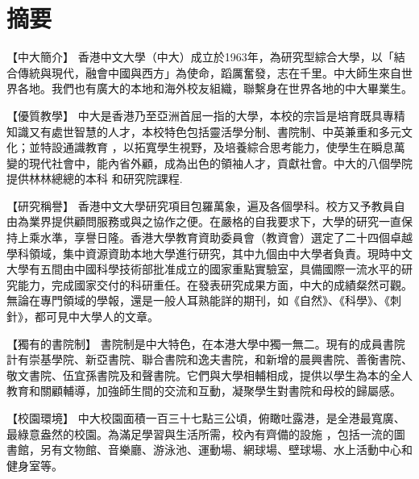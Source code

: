 
\newcommand{\forceindent}{\leavevmode{\parindent=1em\indent}}

\pagestyle{plain}

\chapter*{摘要}
\vspace*{-10mm}

\forceindent
【中大簡介】
香港中文大學（中大）成立於1963年，為研究型綜合大學，以「結合傳統與現代，融會中國與西方」為使命，蹈厲奮發，志在千里。中大師生來自世界各地。我們也有廣大的本地和海外校友組織，聯繫身在世界各地的中大畢業生。

【優質教學】
中大是香港乃至亞洲首屈一指的大學，本校的宗旨是培育既具專精知識又有處世智慧的人才，本校特色包括靈活學分制、書院制、中英兼重和多元文化；並特設通識教育 ，以拓寬學生視野，及培養綜合思考能力，使學生在瞬息萬變的現代社會中，能內省外顧，成為出色的領袖人才，貢獻社會。中大的八個學院 提供林林總總的本科 和研究院課程.

【研究稱譽】
香港中文大學研究項目包羅萬象，遍及各個學科。校方又予教員自由為業界提供顧問服務或與之協作之便。在嚴格的自我要求下，大學的研究一直保持上乘水準，享譽日隆。香港大學教育資助委員會（教資會）選定了二十四個卓越學科領域，集中資源資助本地大學進行研究，其中九個由中大學者負責。現時中文大學有五間由中國科學技術部批准成立的國家重點實驗室，具備國際一流水平的研究能力，完成國家交付的科研重任。在發表研究成果方面，中大的成績粲然可觀。無論在專門領域的學報，還是一般人耳熟能詳的期刊，如《自然》、《科學》、《刺針》，都可見中大學人的文章。

【獨有的書院制】
書院制是中大特色，在本港大學中獨一無二。現有的成員書院計有崇基學院、新亞書院、聯合書院和逸夫書院，和新增的晨興書院、善衡書院、敬文書院、伍宜孫書院及和聲書院。它們與大學相輔相成，提供以學生為本的全人教育和關顧輔導，加強師生間的交流和互動，凝聚學生對書院和母校的歸屬感。

【校園環境】
中大校園面積一百三十七點三公頃，俯瞰吐露港，是全港最寬廣、最綠意盎然的校園。為滿足學習與生活所需，校內有齊備的設施 ，包括一流的圖書館，另有文物館、音樂廳、游泳池、運動場、網球場、壁球場、水上活動中心和健身室等。

\vspace*{15mm}
\cleardoublepage

\let\forceindent\undefined
